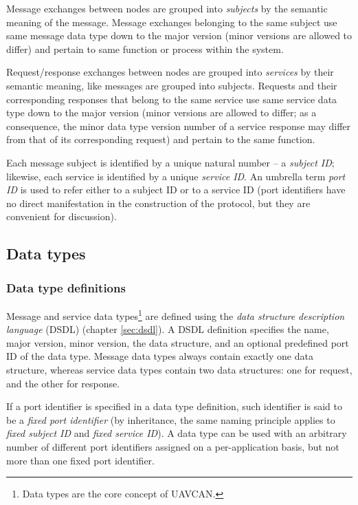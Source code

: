 Message exchanges between nodes are grouped into \emph{subjects} by the semantic meaning of the message.
Message exchanges belonging to the same subject use same message data type down to the major version
(minor versions are allowed to differ) and pertain to same function or process within the system.

Request/response exchanges between nodes are grouped into \emph{services} by their semantic meaning,
like messages are grouped into subjects.
Requests and their corresponding responses that belong to the same service use same service data type down to
the major version (minor versions are allowed to differ; as a consequence, the minor data type version number
of a service response may differ from that of its corresponding request) and pertain to the same function.

Each message subject is identified by a unique natural number -- a \emph{subject ID};
likewise, each service is identified by a unique \emph{service ID}.
An umbrella term \emph{port ID} is used to refer either to a subject ID or to a service ID
(port identifiers have no direct manifestation in the construction of the protocol,
but they are convenient for discussion).

\subsection{Data types}

\subsubsection{Data type definitions}

Message and service data types\footnote{Data types are the core concept of UAVCAN.}
are defined using the \emph{data structure description language} (DSDL) (chapter \ref{sec:dsdl}).
A DSDL definition specifies the name, major version, minor version, the data structure,
and an optional predefined port ID of the data type.
Message data types always contain exactly one data structure, whereas
service data types contain two data structures: one for request, and the other for response.

If a port identifier is specified in a data type definition, such identifier is said to be a
\emph{fixed port identifier}
(by inheritance, the same naming principle applies to \emph{fixed subject ID} and \emph{fixed service ID}).
A data type can be used with an arbitrary number of different port identifiers assigned on a per-application basis,
but not more than one fixed port identifier.

